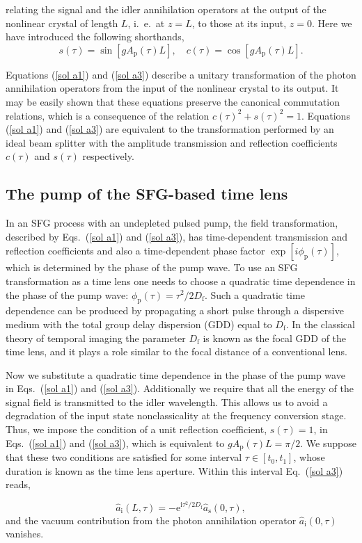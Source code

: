 \documentclass[10pt,twocolumn]{article}
\begin{document}
%
relating the signal and the idler annihilation operators at the output of the nonlinear crystal of length $L$, i.~e.~at $z=L$, to those at its input, $z=0$. Here we have introduced the following shorthands,
%
\begin{equation}
     s(\tau)=\sin[gA_{\mathrm{p}}(\tau)L],  \quad  c(\tau)=\cos[gA_{\mathrm{p}}(\tau)L].\label{coeff}
\end{equation}
%

{%
Equations (\ref{sol a1}) and (\ref{sol a3}) describe a unitary transformation of the photon annihilation operators from the input of the nonlinear crystal to its output. It may be easily shown that these equations preserve the canonical commutation relations, which is a consequence of the relation $c(\tau)^2+s(\tau)^2=1$. Equations (\ref{sol a1}) and (\ref{sol a3}) are equivalent to the transformation performed by an ideal beam splitter with the amplitude transmission and reflection coefficients $c(\tau)$ and $s(\tau)$ respectively.
}

\subsection{The pump of the SFG-based time lens}

{%
In an SFG process with an undepleted pulsed pump, the field transformation, described by Eqs.~(\ref{sol a1}) and (\ref{sol a3}), has time-dependent transmission and reflection coefficients and also a time-dependent phase factor $\exp[i\phi_{\mathrm{p}}(\tau)]$, which is determined by the phase of the pump wave. To use an SFG transformation as a time lens one needs to choose a quadratic time dependence in the phase of the pump wave: $\phi_{\mathrm{p}}(\tau)=\tau^2/2D_{\mathrm{f}}$. Such a quadratic time dependence can be produced by propagating a short pulse through a dispersive medium with the total group delay dispersion (GDD) equal to $D_{\mathrm{f}}$. In the classical  theory of temporal imaging the parameter $D_{\mathrm{f}}$ is known as the focal GDD of the time lens, and it plays a role similar to the focal distance of a conventional lens.

Now we substitute a quadratic time dependence in the phase of the pump wave in Eqs.~(\ref{sol a1}) and (\ref{sol a3}). Additionally we require that all the energy of the signal field is transmitted to the idler wavelength. This allows us to avoid a degradation of the input state nonclassicality at the frequency conversion stage. Thus, we impose the condition of a unit reflection coefficient, $s(\tau)=1$, in Eqs.~(\ref{sol a1}) and (\ref{sol a3}), which is equivalent to $gA_{\mathrm{p}}(\tau)L=\pi/2$. We suppose that these two conditions are satisfied for some interval $\tau\in [t_0,t_1]$, whose duration is known as the time lens aperture. Within this interval Eq.~(\ref{sol a3}) reads,}
%
\begin{equation}
     \hat{a}_{\mathrm{i}}(L,\tau)=
     -\mathrm{e}^{\mathrm{i}\tau^2/2D_{\mathrm{f}}}\hat{a}_{\mathrm{s}}(0,\tau),\label{sol a3 II}
\end{equation}
%
and the vacuum contribution from the photon annihilation operator $\hat{a}_{\mathrm{i}}(0,\tau)$ vanishes.
\end{document}
